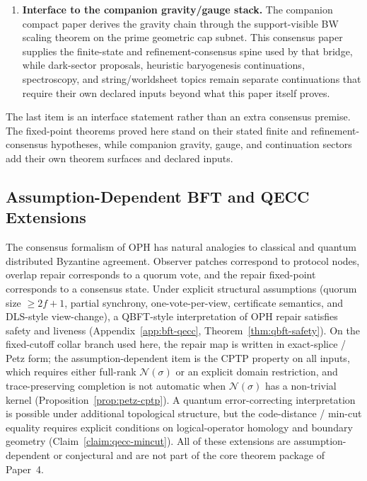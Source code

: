 \documentclass[11pt]{article}
\theoremstyle{remark}
\theoremstyle{plain}
\begin{document}
\begin{enumerate}
\item \textbf{Interface to the companion gravity/gauge stack.} The companion compact paper derives the gravity chain through the support-visible BW scaling theorem on the prime geometric cap subnet. This consensus paper supplies the finite-state and refinement-consensus spine used by that bridge, while dark-sector proposals, heuristic baryogenesis continuations, spectroscopy, and string/worldsheet topics remain separate continuations that require their own declared inputs beyond what this paper itself proves.
\end{enumerate}

The last item is an interface statement rather than an extra consensus premise. The fixed-point
theorems proved here stand on their stated finite and refinement-consensus hypotheses, while
companion gravity, gauge, and continuation sectors add their own theorem surfaces and declared
inputs.

\subsection{Assumption-Dependent BFT and QECC Extensions}
\label{subsec:assumption-dependent-bft-qecc}

The consensus formalism of \textrm{OPH} has natural analogies to classical and quantum
distributed Byzantine agreement. Observer patches correspond to protocol nodes, overlap repair
corresponds to a quorum vote, and the repair fixed-point corresponds to a consensus state. Under
explicit structural assumptions (quorum size $\geq 2f+1$, partial synchrony, one-vote-per-view,
certificate semantics, and \textrm{DLS}-style view-change), a \textrm{QBFT}-style interpretation
of \textrm{OPH} repair satisfies safety and liveness (Appendix~\ref{app:bft-qecc},
Theorem~\ref{thm:qbft-safety}). On the fixed-cutoff collar branch used here, the repair map is
written in exact-splice / Petz form; the assumption-dependent item is the \textrm{CPTP}
property on all inputs, which requires either full-rank $\mathcal{N}(\sigma)$ or an explicit
domain restriction, and trace-preserving completion is not automatic when
$\mathcal{N}(\sigma)$ has a non-trivial kernel
(Proposition~\ref{prop:petz-cptp}). A quantum error-correcting interpretation is possible under
additional topological structure, but the code-distance / min-cut equality requires explicit
conditions on logical-operator homology and boundary geometry (Claim~\ref{claim:qecc-mincut}). All
of these extensions are assumption-dependent or conjectural and are not part of the core theorem package of
Paper~4.
\end{document}
